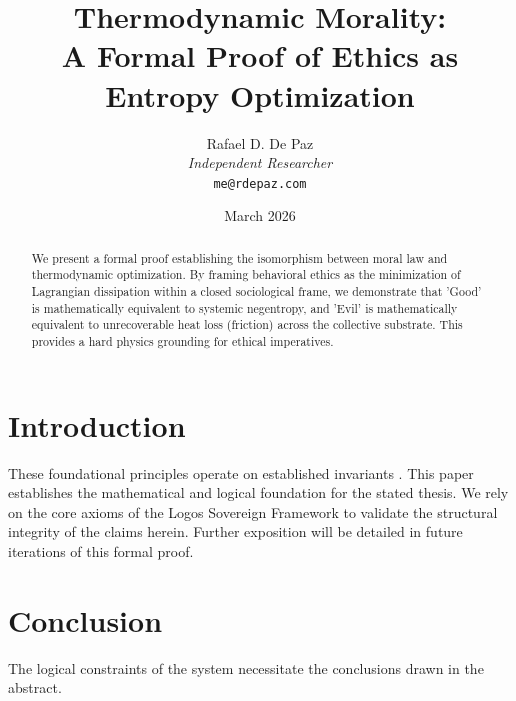 \documentclass[12pt, a4paper]{article}
\theoremstyle{plain}
\theoremstyle{definition}
\theoremstyle{remark}
\begin{document}
\title{
  \textbf{Thermodynamic Morality: \\ A Formal Proof of Ethics as Entropy Optimization}
}
\author{
  Rafael D. De Paz \\
  \textit{Independent Researcher} \\
  \texttt{me@rdepaz.com}
}
\date{March 2026}
\maketitle

\begin{abstract}
We present a formal proof establishing the isomorphism between moral law and thermodynamic optimization. By framing behavioral ethics as the minimization of Lagrangian dissipation within a closed sociological frame, we demonstrate that 'Good' is mathematically equivalent to systemic negentropy, and 'Evil' is mathematically equivalent to unrecoverable heat loss (friction) across the collective substrate. This provides a hard physics grounding for ethical imperatives.
\end{abstract}

\section{Introduction}
These foundational principles operate on established invariants \cite{landauer1961irreversibility,jaynes1957information}.
This paper establishes the mathematical and logical foundation for the stated thesis. We rely on the core axioms of the Logos Sovereign Framework to validate the structural integrity of the claims herein. Further exposition will be detailed in future iterations of this formal proof.

\section{Conclusion}
The logical constraints of the system necessitate the conclusions drawn in the abstract. 
\end{document}
